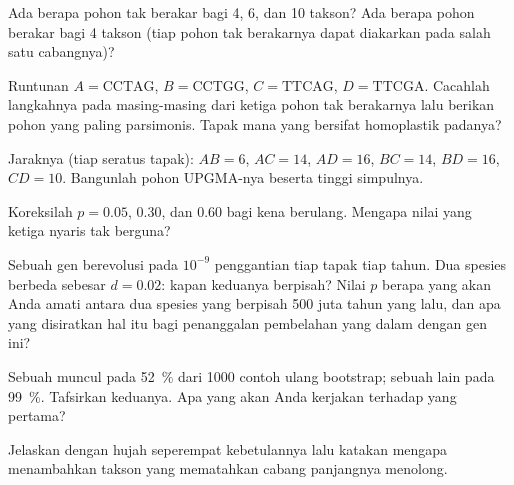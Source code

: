 \begin{exercise}[$\star$]\label{exo:b2:phylogenetic-trees:4}
Ada berapa pohon tak berakar bagi 4, 6, dan 10 takson? Ada berapa pohon
berakar bagi 4 takson (tiap pohon tak berakarnya dapat diakarkan pada
salah satu cabangnya)?
\end{exercise}

\begin{exercise}[$\star\star$]\label{exo:b2:phylogenetic-trees:5}
Runtunan $A = \mathrm{CCTAG}$, $B = \mathrm{CCTGG}$, $C =
\mathrm{TTCAG}$, $D = \mathrm{TTCGA}$. Cacahlah langkahnya pada
masing-masing dari ketiga pohon tak berakarnya lalu berikan pohon yang
paling parsimonis. Tapak mana yang bersifat homoplastik padanya?
\end{exercise}

\begin{exercise}[$\star\star$]\label{exo:b2:phylogenetic-trees:6}
Jaraknya (tiap seratus tapak): $AB = 6$, $AC = 14$, $AD = 16$,
$BC = 14$, $BD = 16$, $CD = 10$. Bangunlah pohon UPGMA-nya beserta
tinggi simpulnya.
\end{exercise}

\begin{exercise}[$\star\star$]\label{exo:b2:phylogenetic-trees:7}
Koreksilah $p = 0.05$, $0.30$, dan $0.60$ bagi kena berulang. Mengapa
nilai yang ketiga nyaris tak berguna?
\end{exercise}

\begin{exercise}[$\star\star$]\label{exo:b2:phylogenetic-trees:8}
Sebuah gen berevolusi pada $10^{-9}$ penggantian tiap tapak tiap tahun.
Dua spesies berbeda sebesar $d = 0.02$: kapan keduanya berpisah?
Nilai $p$ berapa yang akan Anda amati antara dua spesies yang berpisah
500 juta tahun yang lalu, dan apa yang disiratkan hal itu bagi
penanggalan pembelahan yang dalam dengan gen ini?
\end{exercise}

\begin{exercise}[$\star\star$]\label{exo:b2:phylogenetic-trees:9}
Sebuah  muncul pada \qty{52}{\%} dari \num{1000} contoh ulang
bootstrap; sebuah  lain pada \qty{99}{\%}. Tafsirkan keduanya. Apa
yang akan Anda kerjakan terhadap yang pertama?
\end{exercise}

\begin{exercise}[$\star\star\star$]\label{exo:b2:phylogenetic-trees:10}
Jelaskan  dengan hujah seperempat kebetulannya
lalu katakan mengapa menambahkan takson yang mematahkan cabang
panjangnya menolong.
\end{exercise}

